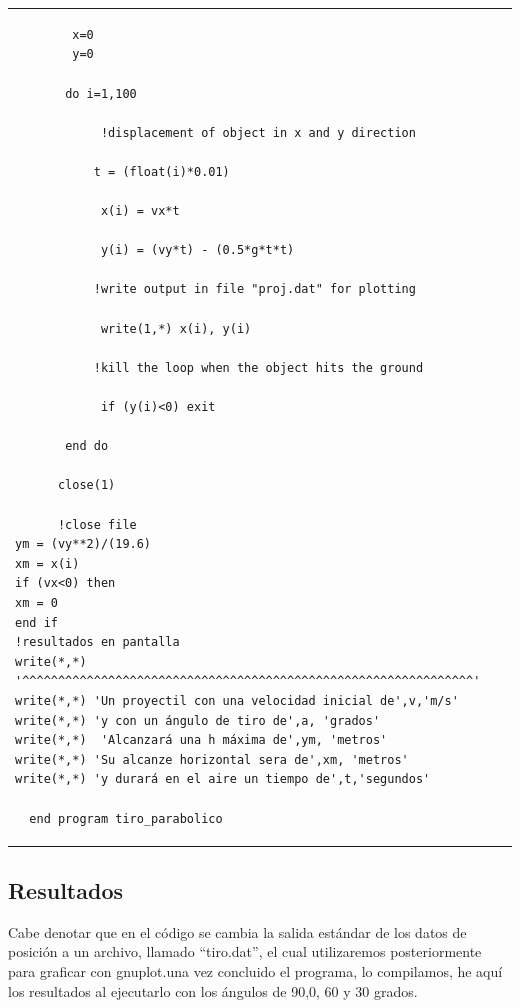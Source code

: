 \documentclass[10pt]{article}
\begin{document}
\begin{tabular}{l}
\begin{verbatim}
        x=0
        y=0 

       do i=1,100   

            !displacement of object in x and y direction   

           t = (float(i)*0.01)   

            x(i) = vx*t   

            y(i) = (vy*t) - (0.5*g*t*t)   

           !write output in file "proj.dat" for plotting   

            write(1,*) x(i), y(i)   

           !kill the loop when the object hits the ground   

            if (y(i)<0) exit   

       end do   

      close(1)   

      !close file 
ym = (vy**2)/(19.6)
xm = x(i)
if (vx<0) then
xm = 0
end if
!resultados en pantalla
write(*,*) '^^^^^^^^^^^^^^^^^^^^^^^^^^^^^^^^^^^^^^^^^^^^^^^^^^^^^^^^^^^^^^^'
write(*,*) 'Un proyectil con una velocidad inicial de',v,'m/s'
write(*,*) 'y con un ángulo de tiro de',a, 'grados'
write(*,*)  'Alcanzará una h máxima de',ym, 'metros'
write(*,*) 'Su alcanze horizontal sera de',xm, 'metros'
write(*,*) 'y durará en el aire un tiempo de',t,'segundos'

  end program tiro_parabolico 

\end{verbatim} \\
\end{tabular}
\newpage
\subsection{Resultados}
Cabe denotar que en el código se cambia la salida estándar de los datos de posición a un archivo, llamado ``tiro.dat'', el cual utilizaremos posteriormente para graficar con gnuplot.una vez concluido el programa, lo compilamos, he aquí los resultados al ejecutarlo con los ángulos de 90,0, 60 y 30 grados.
\end{document}
